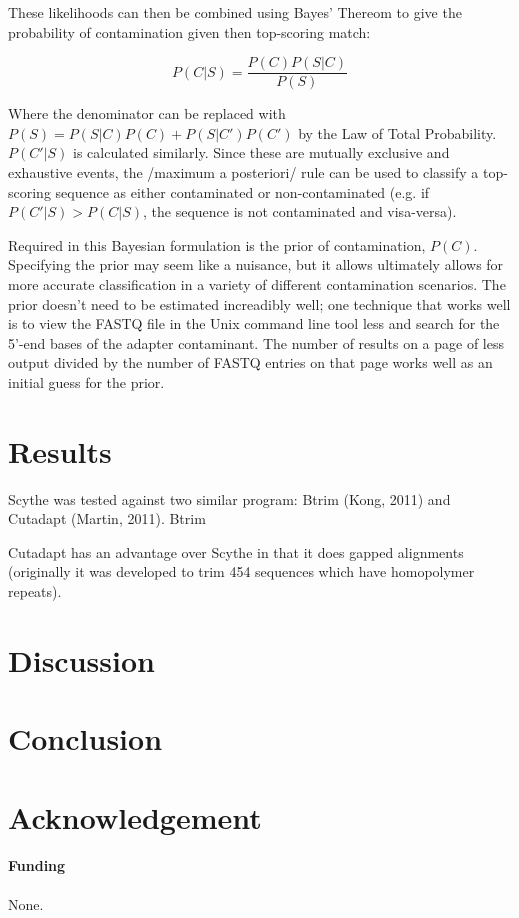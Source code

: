 \documentclass{bioinfo}
\begin{document}
\begin{methods}
These likelihoods can then be combined using Bayes' Thereom to give
the probability of contamination given then top-scoring match:

$$ P(C|S) = \frac{P(C) P(S|C)}{P(S)} $$

Where the denominator can be replaced with $P(S) = P(S | C)P(C) +
P(S | C') P(C')$ by the Law of Total Probability. $P(C'|S)$ is
calculated similarly. Since these are mutually exclusive and
exhaustive events, the /maximum a posteriori/ rule can be used to
classify a top-scoring sequence as either contaminated or
non-contaminated (e.g. if $P(C'|S) > P(C|S)$, the sequence is not
contaminated and visa-versa).

Required in this Bayesian formulation is the prior of contamination,
$P(C)$. Specifying the prior may seem like a nuisance, but it allows
ultimately allows for more accurate classification in a variety of
different contamination scenarios. The prior doesn't need to be
estimated increadibly well; one technique that works well is to view
the FASTQ file in the Unix command line tool less and search for the
5'-end bases of the adapter contaminant. The number of results on a
page of less output divided by the number of FASTQ entries on that
page works well as an initial guess for the prior.


\section{Results}
Scythe was tested against two similar program: Btrim (Kong, 2011) and
Cutadapt (Martin, 2011). Btrim

Cutadapt has an advantage over Scythe in that it does gapped
alignments (originally it was developed to trim 454 sequences which
have homopolymer repeats).
\end{methods}

\section{Discussion}

\section{Conclusion}


\section*{Acknowledgement}

\paragraph{Funding\textcolon} None.










\end{document}
